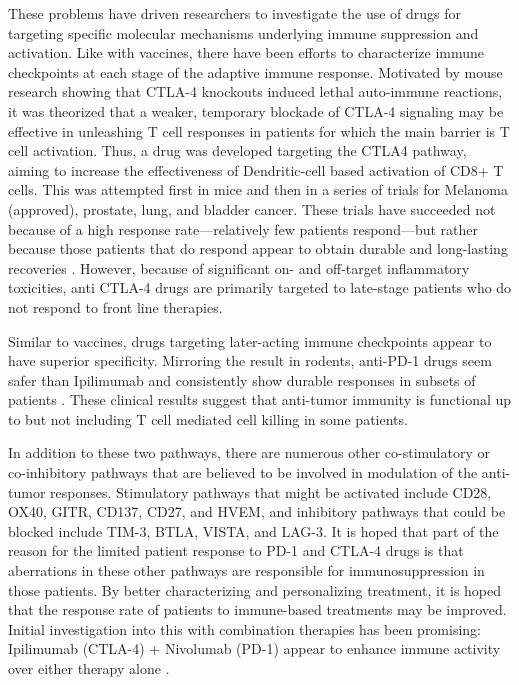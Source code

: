 These problems have driven researchers to investigate the use of drugs for targeting specific molecular mechanisms underlying immune suppression and activation. 
Like with vaccines, there have been efforts to characterize immune checkpoints at each stage of the adaptive immune response. 
Motivated by mouse research showing that CTLA-4 knockouts induced lethal auto-immune reactions, it was theorized that a weaker, temporary blockade of CTLA-4 signaling may be effective in unleashing T cell responses in patients for which the main barrier is T cell activation. 
Thus, a drug was developed targeting the CTLA4 pathway, aiming to increase the effectiveness of Dendritic-cell based activation of CD8+ T cells. 
This was attempted first in mice and then in a series of trials for Melanoma (approved), prostate, lung, and bladder cancer. %
These trials have succeeded not because of a high response rate---relatively few patients respond---but rather because those patients that do respond appear to obtain durable and long-lasting recoveries \citep{Robert2011,Hodi2010}.
However, because of significant on- and off-target inflammatory toxicities, anti CTLA-4 drugs are primarily targeted to late-stage patients who do not respond to front line therapies. 

Similar to vaccines, drugs targeting later-acting immune checkpoints appear to have superior specificity. 
Mirroring the result in rodents, anti-PD-1 drugs seem safer than Ipilimumab \citep{Brahmer2010} and consistently show durable responses in subsets of patients \citep{Hamid2013,McDermott2014}. 
These clinical results suggest that anti-tumor immunity is functional up to but not including T cell mediated cell killing in some patients. %

In addition to these two pathways, there are numerous other co-stimulatory or co-inhibitory pathways that are believed to be involved in modulation of the anti-tumor responses. 
Stimulatory pathways that might be activated include CD28, OX40, GITR, CD137, CD27, and HVEM, and inhibitory pathways that could be blocked include TIM-3, BTLA, VISTA, and LAG-3. 
It is hoped that part of the reason for the limited patient response to PD-1 and CTLA-4 drugs is that aberrations in these other pathways are responsible for immunosuppression in those patients. 
By better characterizing and personalizing treatment, it is hoped that the response rate of patients to immune-based treatments may be improved. 
Initial investigation into this with combination therapies has been promising: Ipilimumab (CTLA-4) + Nivolumab (PD-1) appear to enhance immune activity over either therapy alone \citep{Wolchok2013}.

